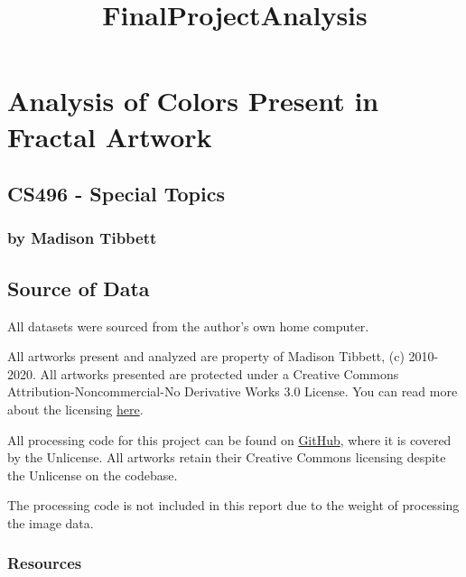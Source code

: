 \documentclass[11pt]{article}
\title{FinalProjectAnalysis}
\begin{document}
    
    
    \maketitle
    
    

    
    \hypertarget{analysis-of-colors-present-in-fractal-artwork}{%
\section{Analysis of Colors Present in Fractal
Artwork}\label{analysis-of-colors-present-in-fractal-artwork}}

\hypertarget{cs496---special-topics}{%
\subsection{CS496 - Special Topics}\label{cs496---special-topics}}

\hypertarget{by-madison-tibbett}{%
\subsubsection{by Madison Tibbett}\label{by-madison-tibbett}}

\hypertarget{source-of-data}{%
\subsection{Source of Data}\label{source-of-data}}

All datasets were sourced from the author's own home computer.

All artworks present and analyzed are property of Madison Tibbett, (c)
2010-2020. All artworks presented are protected under a Creative Commons
Attribution-Noncommercial-No Derivative Works 3.0 License. You can read
more about the licensing
\href{https://creativecommons.org/licenses/by-nc-nd/3.0/}{here}.

All processing code for this project can be found on
\href{https://github.com/Esherymack/color-analyzer}{GitHub}, where it is
covered by the Unlicense. All artworks retain their Creative Commons
licensing despite the Unlicense on the codebase.

The processing code is not included in this report due to the weight of
processing the image data.

\hypertarget{resources}{%
\subsubsection{Resources}\label{resources}}
\end{document}
